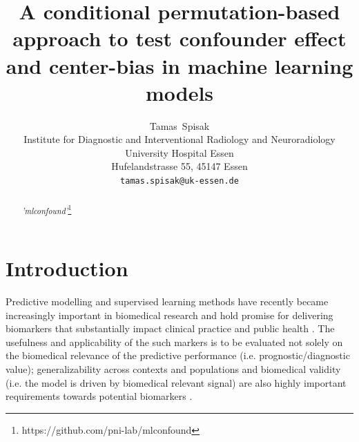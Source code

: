 \documentclass{article}
\title{A conditional permutation-based approach to test confounder effect and center-bias in machine learning models}
\author{
  Tamas~Spisak \\
  Institute for Diagnostic and Interventional Radiology and Neuroradiology \\
  University Hospital Essen\\
  Hufelandstrasse 55, 45147 Essen \\
  \texttt{tamas.spisak@uk-essen.de} \\
}
\begin{document}
\maketitle

\begin{abstract} %
\lipsum[1]
\emph{'mlconfound'}\footnote{https://github.com/pni-lab/mlconfound}
\end{abstract}



\section{Introduction}

Predictive modelling and supervised learning methods have recently became increasingly important in biomedical research and hold promise for delivering biomarkers that substantially impact clinical practice and public health \citep{kent2018personalized}. The usefulness and applicability of the such markers is to be evaluated not solely on the biomedical relevance of the predictive performance (i.e. prognostic/diagnostic value); generalizability across contexts and populations and biomedical validity (i.e. the model is driven by biomedical relevant signal) are also highly important requirements towards potential biomarkers \citep{woo2017building}.
\end{document}
